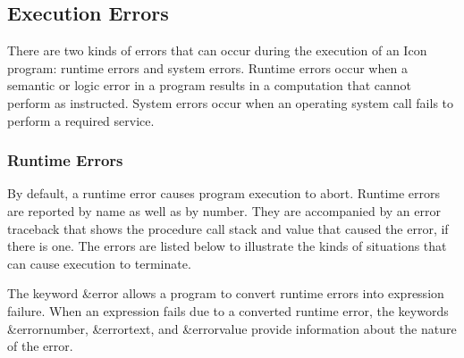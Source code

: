 \subsection{Execution Errors}
There are two kinds of errors that can occur during the execution of an
Icon program: runtime errors and system errors. Runtime errors occur
when a semantic or logic error in a program results in a computation
that cannot perform as instructed. System errors occur when an
operating system call fails to perform a
required service.

\subsubsection{Runtime Errors}
By default, a runtime error causes program
execution to abort. Runtime errors are reported by name as well as by
number. They are accompanied by an error traceback that shows the
procedure call stack and value that caused the error, if there is one.
The errors are listed below to illustrate the kinds of situations that
can cause execution to terminate.

The keyword \&error allows a program to convert runtime errors into
expression failure. When an expression fails due to a converted runtime
error, the keywords \&errornumber, \&errortext, and \&errorvalue
provide information about the nature of the error.

